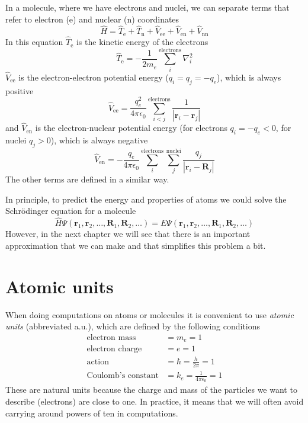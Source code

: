 \documentclass[../Main/chem371-notes.tex]{subfiles}
\begin{document}
In a molecule, where we have electrons and nuclei, we can separate terms that refer to electron (e) and nuclear (n) coordinates
\begin{equation}
\hat{H} = \hat{T}_\mathrm{e} + \hat{T}_\mathrm{n} +  \hat{V}_\mathrm{ee} + \hat{V}_\mathrm{en} + \hat{V}_\mathrm{nn}
\end{equation}
In this equation $\hat{T}_\mathrm{e}$ is the kinetic energy of the electrons
\begin{equation}
\hat{T}_\mathrm{e} = -\frac{1}{2 m_e}  \sum_{i}^{\mathrm{electrons}}\nabla^2_i
\end{equation}
$\hat{V}_\mathrm{ee}$ is the electron-electron potential energy ($q_i = q_j = - q_e$), which is always positive
\begin{equation}
\hat{V}_\mathrm{ee} = \frac{q_e^2}{4\pi \epsilon_0}  \sum_{i < j}^{\mathrm{electrons}} \frac{1}{|\mathbf{r}_{i} - \mathbf{r}_{j}|}
\end{equation}
and $\hat{V}_\mathrm{en}$ is the electron-nuclear potential energy (for electrons $q_i = -q_e < 0$, for nuclei $q_j > 0$), which is always negative
\begin{equation}
\hat{V}_\mathrm{en} = - \frac{q_e}{4\pi \epsilon_0}  \sum_{i}^{\mathrm{electrons}}  \sum_{j}^{\mathrm{nuclei}} \frac{q_j}{|\mathbf{r}_{i} - \mathbf{R}_{j}|}
\end{equation}
The other terms are defined in a similar way.

In principle, to predict the energy and properties of atoms we could solve the Schr\"{o}dinger equation for a molecule
\begin{equation}
\hat{H} \Psi(\mathbf{r}_1, \mathbf{r}_2, \ldots, \mathbf{R}_1,  \mathbf{R}_2,\ldots) = E \Psi(\mathbf{r}_1, \mathbf{r}_2, \ldots, \mathbf{R}_1,  \mathbf{R}_2,\ldots)
\end{equation}
However, in the next chapter we will see that there is an important approximation that we can make and that simplifies this problem a bit.

\section{Atomic units}
When doing computations on atoms or molecules it is convenient to use \emph{atomic units} (abbreviated a.u.), which are defined by the following conditions
\begin{align}
\text{electron mass} & = m_e = 1\\
\text{electron charge} & = e = 1\\
\text{action} & = \hbar = \frac{h}{2\pi} = 1\\
\text{Coulomb's constant} & = k_e = \frac{1}{4\pi \epsilon_0} = 1
\end{align}
These are natural units because the charge and mass of the particles we want to describe (electrons) are close to one.
In practice, it means that we will often avoid carrying around powers of ten in computations.
\end{document}
